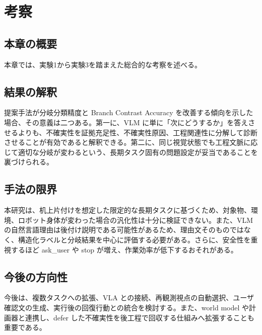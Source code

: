 \chapter{考察}

\section{本章の概要}

本章では、実験1から実験3を踏まえた総合的な考察を述べる。

\section{結果の解釈}

提案手法が分岐分類精度と Branch Contrast Accuracy を改善する傾向を示した場合、その意義は二つある。第一に、VLM に単に「次にどうするか」を答えさせるよりも、不確実性を証拠充足性、不確実性原因、工程関連性に分解して診断させることが有効であると解釈できる。第二に、同じ視覚状態でも工程文脈に応じて適切な分岐が変わるという、長期タスク固有の問題設定が妥当であることを裏づけられる。

\section{手法の限界}

本研究は、机上片付けを想定した限定的な長期タスクに基づくため、対象物、環境、ロボット身体が変わった場合の汎化性は十分に検証できない。また、VLM の自然言語理由は後付け説明である可能性があるため、理由文そのものではなく、構造化ラベルと分岐結果を中心に評価する必要がある。さらに、安全性を重視するほど ask\_user や stop が増え、作業効率が低下するおそれがある。

\section{今後の方向性}

今後は、複数タスクへの拡張、VLA との接続、再観測視点の自動選択、ユーザ確認文の生成、実行後の回復行動との統合を検討する。また、world model や計画器と連携し、defer した不確実性を後工程で回収する仕組みへ拡張することも重要である。

